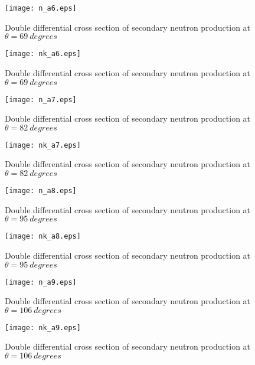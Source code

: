 \documentclass[12pt]{article}
\begin{document}
\begin{figure}[htbp]
\caption{Double differential cross section of secondary neutron production at $\theta = 69~degrees$}
\label{figa6} 
\centerline{\texttt{[image: n\_a6.eps]}}
\end{figure}

\begin{figure}[htbp]
\caption{Double differential cross section of secondary neutron production at $\theta = 69~degrees$}
\label{figa6a} 
\centerline{\texttt{[image: nk\_a6.eps]}}
\end{figure}

\begin{figure}[htbp]
\caption{Double differential cross section of secondary neutron production at $\theta = 82~degrees$}
\label{figa7} 
\centerline{\texttt{[image: n\_a7.eps]}}
\end{figure}

\begin{figure}[htbp]
\caption{Double differential cross section of secondary neutron production at $\theta = 82~degrees$}
\label{figa7a} 
\centerline{\texttt{[image: nk\_a7.eps]}}
\end{figure}

\begin{figure}[htbp]
\caption{Double differential cross section of secondary neutron production at $\theta = 95~degrees$}
\label{figa8} 
\centerline{\texttt{[image: n\_a8.eps]}}
\end{figure}

\begin{figure}[htbp]
\caption{Double differential cross section of secondary neutron production at $\theta = 95~degrees$}
\label{figa8a} 
\centerline{\texttt{[image: nk\_a8.eps]}}
\end{figure}

\clearpage

\begin{figure}[htbp]
\caption{Double differential cross section of secondary neutron production at $\theta = 106~degrees$}
\label{figa9} 
\centerline{\texttt{[image: n\_a9.eps]}}
\end{figure}


\begin{figure}[htbp]
\caption{Double differential cross section of secondary neutron production at $\theta = 106~degrees$}
\label{figa9a} 
\centerline{\texttt{[image: nk\_a9.eps]}}
\end{figure}
\end{document}
